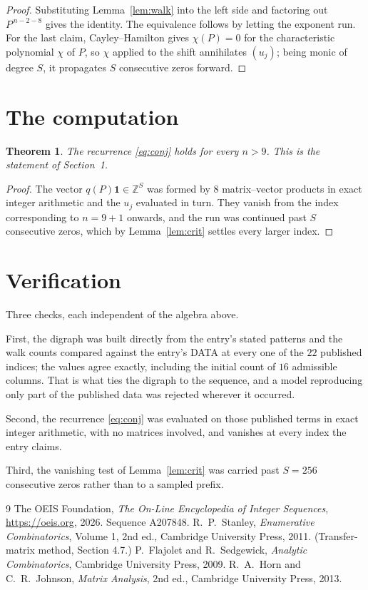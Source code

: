 \documentclass[11pt,a4paper]{article}
\theoremstyle{plain}
\newtheorem{theorem}{Theorem}
\theoremstyle{definition}
\begin{document}
\begin{proof}
Substituting Lemma~\ref{lem:walk} into the left side and factoring out
$P^{\,n-2-8}$ gives the identity. The equivalence follows by letting the exponent
run. For the last claim, Cayley--Hamilton gives $\chi(P)=0$ for the characteristic
polynomial $\chi$ of $P$, so $\chi$ applied to the shift annihilates $(u_j)$; being monic of
degree $S$, it propagates $S$ consecutive zeros forward.
\end{proof}

\section{The computation}

\begin{theorem}
The recurrence \eqref{eq:conj} holds for every $n>9$. This is the statement of
Section~1.
\end{theorem}

\begin{proof}
The vector $q(P)\mathbf{1}\in\mathbb{Z}^{S}$ was formed by $8$ matrix--vector
products in exact integer arithmetic and the $u_j$ evaluated in turn. They vanish from the
index corresponding to $n=9+1$ onwards, and the run was continued past $S$ consecutive
zeros, which by Lemma~\ref{lem:crit} settles every larger index.
\end{proof}

\section{Verification}

Three checks, each independent of the algebra above.

First, the digraph was built directly from the entry's stated patterns and the walk counts
compared against the entry's DATA at every one of the $22$ published indices; the
values agree exactly, including the initial count of $16$ admissible columns. That is
what ties the digraph to the sequence, and a model reproducing only part of the published
data was rejected wherever it occurred.

Second, the recurrence \eqref{eq:conj} was evaluated on those published terms in exact
integer arithmetic, with no matrices involved, and vanishes at every index the entry claims.

Third, the vanishing test of Lemma~\ref{lem:crit} was carried past $S=256$ consecutive
zeros rather than to a sampled prefix.

\begin{thebibliography}{9}
 The OEIS Foundation, \emph{The On-Line Encyclopedia of Integer
Sequences}, \url{https://oeis.org}, 2026. Sequence A207848.
 R.~P.~Stanley, \emph{Enumerative Combinatorics}, Volume 1, 2nd ed.,
Cambridge University Press, 2011. (Transfer-matrix method, Section 4.7.)
 P.~Flajolet and R.~Sedgewick, \emph{Analytic Combinatorics}, Cambridge
University Press, 2009.
 R.~A.~Horn and C.~R.~Johnson, \emph{Matrix Analysis}, 2nd ed., Cambridge
University Press, 2013.
\end{thebibliography}
\end{document}

